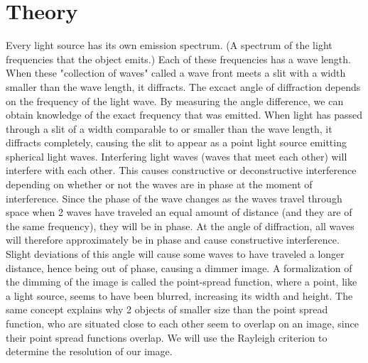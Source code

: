 \section{Theory}
    Every light source has its own emission spectrum. (A spectrum of the light frequencies that the object emits.)
\newline
    Each of these frequencies has a wave length. When these "collection of waves" called a wave front meets a slit with a width smaller than the wave length, it diffracts.
\newline
    The excact angle of diffraction depends on the frequency of the light wave.
\newline
    By measuring the angle difference, we can obtain knowledge of the exact frequency that was emitted.
\newline
\newline
    When light has passed through a slit of a width comparable to or smaller than the wave length, it diffracts completely, causing the slit to appear as a point light source emitting spherical light waves.
\newline
\newline
    Interfering light waves (waves that meet each other) will interfere with each other. This causes constructive or deconstructive interference depending on whether or not the waves are in phase at the moment of interference. 
\newline    
    Since the phase of the wave changes as the waves travel through space when 2 waves have traveled an equal amount of distance (and they are of the same frequency), they will be in phase.
\newline
    At the angle of diffraction, all waves will therefore approximately be in phase and cause constructive interference.
\newline
    Slight deviations of this angle will cause some waves to have traveled a longer distance, hence being out of phase, causing a dimmer image.
\newline
    A formalization of the dimming of the image is called the point-spread function, where a point, like a light source, seems to have been blurred, increasing its width and height.
\newline
    The same concept explains why 2 objects of smaller size than the point spread function, who are situated close to each other seem to overlap on an image, since their point spread functions overlap.
\newline
\newline
    We will use the Rayleigh criterion to determine the resolution of our image.


    

    
    


